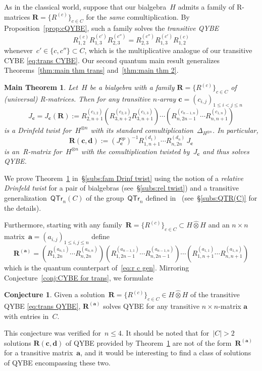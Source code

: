 \documentclass[12pt, reqno]{amsart}
\newcommand{\wh}[1]{\widehat{#1}}
\newtheorem{mthm}[theorem]{Main Theorem}
\theoremstyle{definition}
\newtheorem{conjecture}[theorem]{Conjecture}
\numberwithin{equation}{section}
\newcommand{\tensor}{\otimes}
\begin{document}
As in the classical world, suppose that our bialgebra~$H$
admits a family of R-matrices $\mathbf R=\{R^{(c)}\}_{c\in C}$
for the {\em same} comultiplication.
By Proposition~\ref{prop:cQYBE}, such a family solves the {\em transitive QYBE}
\begin{equation}\label{eq:trans QYBE}
R_{1,2}^{(c)}R_{1,3}^{(c')}R_{2,3}^{(c'')}
=R_{2,3}^{(c'')}R_{1,3}^{(c')}R_{1,2}^{(c)}
\end{equation}
whenever~$c'\in\{c,c''\}\subset C$, which
is the multiplicative analogue
of our transitive CYBE \eqref{eq:trans CYBE}.
Our second quantum main result generalizes Theorems~\ref{thm:main thm trans}
and~\ref{thm:main thm 2}.
\begin{mthm}\label{thm:trans twist}
Let~$H$ be a bialgebra with a family
$\mathbf R=\{R^{(c)}\}_{c\in C}$ of (universal) R-matrices.
Then for any transitive $n$-array $\mathbf c=(c_{i,j})_{1\le i<j\le n}$
$$
J_{\mathbf c}=J_{\mathbf c}(\mathbf R):=R_{2,n+1}^{(c_{1,2})}
(R_{3,n+2}^{(c_{2,3})}R_{3,n+1}^{(c_{1,3})})
\cdots (R_{n,2n-1}^{(c_{n-1,n})}\cdots 
R_{n,n+1}^{(c_{1,n})})
$$
is a Drinfeld twist for~$H^{\tensor n}$ with its
standard comultiplication~$\Delta_{H^{\tensor n}}$. 
In particular, $$
\mathbf R(\mathbf c,\boldsymbol{d}):=
(J_{\mathbf c}^{op})^{-1} R_{1,n+1}^{(d_1)}
\cdots R_{n,2n}^{(d_n)}\,J_{\mathbf c}
$$
is an~R-matrix for~$H^{\tensor n}$ with 
the comultiplication twisted by~$J_{\mathbf c}$
and thus solves QYBE.
\end{mthm}
We prove Theorem~\ref{thm:trans twist} in~\S\ref{subs:fam Drinf twist}
using the notion of a {\em relative Drinfeld twist}
for a pair of bialgebras (see~\S\ref{subs:rel twist})
and a transitive generalization~$\mathsf{QTr}_n(C)$
of the group~$\mathsf{QTr}_n$ defined in~\cite{BEER}
(see~\S\ref{subs:QTR(C)} for the details).



Furthermore, starting with any family~$\mathbf R=\{R^{(c)}\}_{c\in C}\subset H\wh\tensor H$ and an $n\times n$ matrix~$\boldsymbol{a}=(a_{i,j})_{1\le i,j\le n}$
define 
$$
\mathbf R^{(\boldsymbol{a})}=
(R_{1,2n}^{(a_{n,1})}\cdots 
R_{n,2n}^{(a_{n,n})}) 
(R_{1,2n-1}^{(a_{n-1,1})}\cdots 
R_{n,2n-1}^{(a_{n-1,n})})
\cdots (R_{1,n+1}^{(a_{1,1})}\cdots R_{n,n+1}^{(a_{1,n})})
$$
which is the quantum counterpart of~\eqref{eq:r c gen}.
Mirroring Conjecture~\ref{conj:CYBE for trans}, we formulate 
\begin{conjecture}\label{conj:QYBE for trans}
Given a solution~$\mathbf R=\{R^{(c)}\}_{c\in C}\in H\wh\tensor H$ of the transitive QYBE \eqref{eq:trans QYBE}, 
$\mathbf R^{(\boldsymbol{a})}$ solves QYBE for any transitive $n\times n$-matrix $\boldsymbol{a}$ with 
entries in~$C$.
\end{conjecture}
This conjecture was verified for~$n\le 4$. It should
be noted that for~$|C|>2$ solutions $\mathbf R(\mathbf c,\boldsymbol{d})$ of QYBE provided by Theorem~\ref{thm:trans twist} are not of the form~$\mathbf R^{(\boldsymbol{a})}$ for a transitive
matrix~$\boldsymbol a$, and it would be interesting to
find a class of solutions of QYBE encompassing these two.
\end{document}
